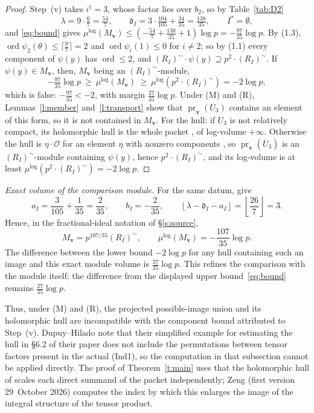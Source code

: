 \documentclass[11pt]{amsart}
\theoremstyle{remark}
\newcommand{\cO}{\mathcal O}
\newcommand{\dd}{\mathfrak d}
\newcommand{\mulog}{\mu^{\log}}
\newcommand{\RIt}{(R_I)^{\sim}}
\newcommand{\pr}{\operatorname{pr}}
\newcommand{\bv}{\mathbf v}
\begin{document}
\begin{proof}
Step~(v) takes $i^\dagger=3$, whose factor lies over $b_2$, so by Table~\ref{tab:D2}
\[
\lambda=9\cdot\tfrac67=\tfrac{54}7,\qquad \dd_I=3\cdot\tfrac{104}{105}+\tfrac{34}{35}=\tfrac{138}{35},\qquad
I^*=\emptyset,
\]
and \eqref{eq:bound} gives $\mulog(M_{\bv})\le(-\tfrac{54}7+\tfrac{138}{35}+1)\log p=-\tfrac{97}{35}\log p$. By (1.3),
$\operatorname{ord}\psi_2(\theta)\le\lceil\tfrac97\rceil=2$ and $\operatorname{ord}\psi_i(1)\le0$ for $i\ne2$; so by
(1.1) every component of $\psi(y)$ has $\operatorname{ord}\le2$, and $\RIt\cdot\psi(y)\supseteq p^2\cdot\RIt$. If
$\psi(y)\in M_{\bv}$, then, $M_{\bv}$ being an $\RIt$-module,
\[
-\tfrac{97}{35}\log p\ \ge\ \mulog(M_{\bv})\ \ge\ \mulog(p^2\cdot\RIt)=-2\log p,
\]
which is false: $-\tfrac{97}{35}<-2$, with margin $\tfrac{27}{35}\log p$.
Under \textup{(M)} and \textup{(R)}, Lemmas~\ref{l:member} and~\ref{l:transport} show that $\pr_{\bv}(U_3)$ contains an element of this form, so it is not contained in $M_{\bv}$. For the hull: if $U_3$ is not relatively compact, its holomorphic hull
is the whole packet \cite[Rem.~3.9.5(i)]{IUT3}, of log-volume $+\infty$. Otherwise the hull is $\eta\cdot\cO$ for an
element $\eta$ with nonzero components \cite[ibid.]{IUT3}, so $\pr_{\bv}(\overline U_3)$ is an $\RIt$-module
containing $\psi(y)$, hence $p^2\cdot\RIt$, and its log-volume is at least $\mulog(p^2\cdot\RIt)=-2\log p$.
\end{proof}

\smallskip
\noindent\emph{Exact volume of the comparison module.}
For the same datum, \cite[Props.~1.2, 1.4(i)]{IUT4} give
\[
 a_I=\frac{3}{105}+\frac{1}{35}=\frac{2}{35},\qquad
 b_I=-\frac{2}{35},\qquad
 \left\lfloor\lambda-\dd_I-a_I\right\rfloor
 =\left\lfloor\frac{26}{7}\right\rfloor=3.
\]
Hence, in the fractional-ideal notation of \S\ref{s:source},
\[
 M_{\bv}=p^{107/35}\RIt,\qquad
 \mulog(M_{\bv})=-\frac{107}{35}\log p.
\]
The difference between the lower bound $-2\log p$ for any hull containing such an
image and this exact module volume is $\tfrac{37}{35}\log p$.
This refines the comparison with the module itself; the difference from the displayed
upper bound~\eqref{eq:bound} remains $\tfrac{27}{35}\log p$.

Thus, under \textup{(M)} and \textup{(R)}, the projected possible-image union and its holomorphic hull are incompatible with the component bound attributed to Step~(v).
Dupuy--Hilado \cite[\S6.2, footnote~7]{DH} note that their simplified example for
estimating the hull in \S6.2 of their paper does not include the permutations between tensor factors
present in the actual (Ind1), so the computation in that subsection cannot be applied directly.
The proof of Theorem~\ref{t:main} uses that the holomorphic hull of \cite[Rem.~3.9.5(i)]{IUT3} scales each direct
summand of the packet independently; Zeng \cite{Zeng} (first version 29~October 2026) computes the index by which
this enlarges the image of the integral structure of the tensor product.
\end{document}

